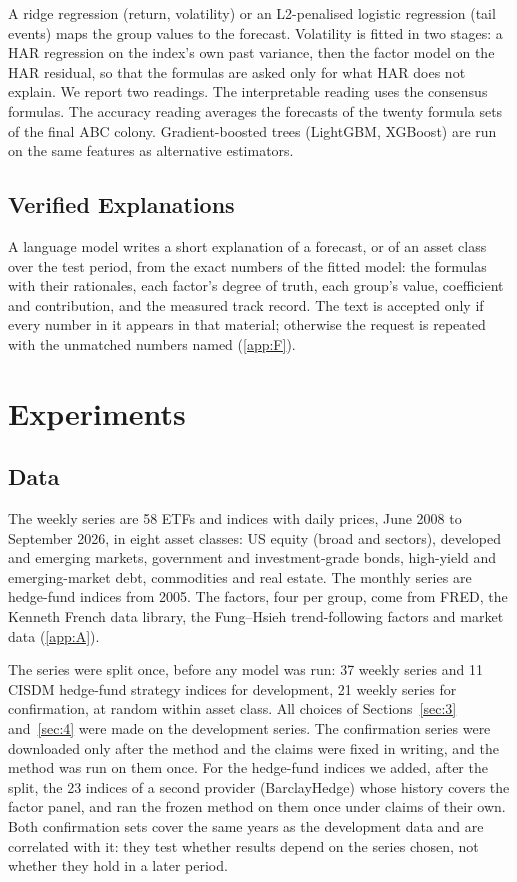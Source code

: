 \documentclass[review]{elsarticle}
\begin{document}
A ridge regression (return, volatility) or an L2-penalised logistic regression (tail events) maps the group values to the forecast. Volatility is fitted in two stages: a HAR regression on the index's own past variance, then the factor model on the HAR residual, so that the formulas are asked only for what HAR does not explain. We report two readings. The interpretable reading uses the consensus formulas. The accuracy reading averages the forecasts of the twenty formula sets of the final ABC colony. Gradient-boosted trees (LightGBM, XGBoost) are run on the same features as alternative estimators.

\subsection{Verified Explanations}\label{sec:4.4}

A language model writes a short explanation of a forecast, or of an asset class over the test period, from the exact numbers of the fitted model: the formulas with their rationales, each factor's degree of truth, each group's value, coefficient and contribution, and the measured track record. The text is accepted only if every number in it appears in that material; otherwise the request is repeated with the unmatched numbers named (\ref{app:F}).

\section{Experiments}\label{sec:5}

\subsection{Data}\label{sec:5.1}

The weekly series are 58 ETFs and indices with daily prices, June 2008 to September 2026, in eight asset classes: US equity (broad and sectors), developed and emerging markets, government and investment-grade bonds, high-yield and emerging-market debt, commodities and real estate. The monthly series are hedge-fund indices from 2005. The factors, four per group, come from FRED, the Kenneth French data library, the Fung--Hsieh trend-following factors and market data (\ref{app:A}).

The series were split once, before any model was run: 37 weekly series and 11 CISDM hedge-fund strategy indices for development, 21 weekly series for confirmation, at random within asset class. All choices of Sections~\ref{sec:3} and~\ref{sec:4} were made on the development series. The confirmation series were downloaded only after the method and the claims were fixed in writing, and the method was run on them once. For the hedge-fund indices we added, after the split, the 23 indices of a second provider (BarclayHedge) whose history covers the factor panel, and ran the frozen method on them once under claims of their own. Both confirmation sets cover the same years as the development data and are correlated with it: they test whether results depend on the series chosen, not whether they hold in a later period.
\end{document}
